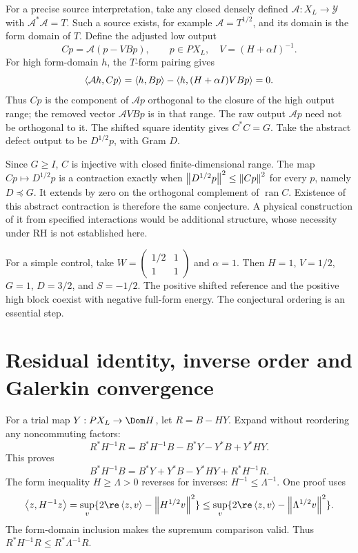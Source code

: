 For a precise source interpretation, take any closed densely defined
$\mathcal A:X_L\to\mathcal Y$ with $\mathcal A^*\mathcal A=T$.
Such a source exists, for example $\mathcal A=T^{1/2}$, and its domain
is the form domain of $T$. Define the adjusted low output
\begin{equation}\label{d:projected-source}
Cp=\mathcal A(p-VBp),\qquad p\in PX_L,\quad V=(H+\alpha I)^{-1}.
\end{equation}
For high form-domain $h$, the $T$-form pairing gives
\[
\left\langle\mathcal A h,Cp\right\rangle
=\left\langle h,Bp\right\rangle-\left\langle h,(H+\alpha I)VBp\right\rangle=0.
\]
Thus $Cp$ is the component of $\mathcal Ap$ orthogonal to the closure
of the high output range; the removed vector $\mathcal AVBp$ is in that
range. The raw output $\mathcal Ap$ need not be orthogonal to it.
The shifted square identity gives $C^*C=G$. Take the abstract defect
output to be $D^{1/2}p$, with Gram $D$.

Since $G\ge I$, $C$ is injective with closed finite-dimensional range.
The map $Cp\mapsto D^{1/2}p$ is a contraction exactly when
$\left\lVert D^{1/2}p\right\rVert^2\le\left\lVert Cp\right\rVert^2$ for every $p$, namely $D\preceq G$.
It extends by zero on the orthogonal complement of $\operatorname{ran}C$.
Existence of this abstract contraction is therefore the same conjecture.
A physical construction of it from specified interactions would be
additional structure, whose necessity under RH is not established here.

For a simple control, take
$W=\left(\begin{smallmatrix}1/2&1\\1&1\end{smallmatrix}\right)$ and
$\alpha=1$. Then $H=1$, $V=1/2$, $G=1$, $D=3/2$, and $S=-1/2$.
The positive shifted reference and the positive high block coexist with
negative full-form energy. The conjectural ordering is an essential step.

\section{Residual identity, inverse order and Galerkin convergence}
For a trial map $Y:PX_L\to\Dom H$, let $R=B-HY$. Expand without
reordering any noncommuting factors:
\[
R^*H^{-1}R=B^*H^{-1}B-B^*Y-Y^*B+Y^*HY.
\]
This proves
\begin{equation}\label{d:residual}
B^*H^{-1}B=B^*Y+Y^*B-Y^*HY+R^*H^{-1}R.
\end{equation}
The form inequality $H\ge\Lambda>0$ reverses for inverses:
$H^{-1}\le\Lambda^{-1}$. One proof uses
\[
\ip z{H^{-1}z}=\sup_v\{2\re\ip z v-\norm{H^{1/2}v}^2\}
\le\sup_v\{2\re\ip z v-\norm{\Lambda^{1/2}v}^2\}.
\]
The form-domain inclusion makes the supremum comparison valid.
Thus $R^*H^{-1}R\le R^*\Lambda^{-1}R$.

